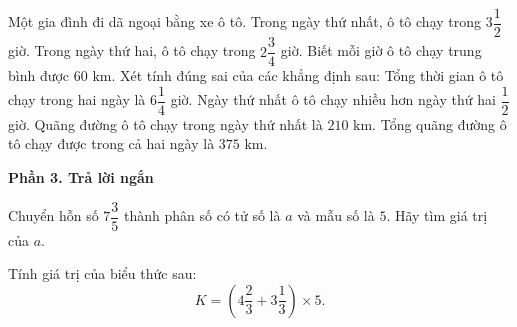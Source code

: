 \begin{ex} %
Một gia đình đi dã ngoại bằng xe ô tô. Trong ngày thứ nhất, ô tô chạy trong $3\dfrac{1}{2}$ giờ. Trong ngày thứ hai, ô tô chạy trong $2\dfrac{3}{4}$ giờ. Biết mỗi giờ ô tô chạy trung bình được $60\text{ km}$. Xét tính đúng sai của các khẳng định sau:
\choiceTF
{\True Tổng thời gian ô tô chạy trong hai ngày là $6\dfrac{1}{4}$ giờ.}
{Ngày thứ nhất ô tô chạy nhiều hơn ngày thứ hai $\dfrac{1}{2}$ giờ.}
{\True Quãng đường ô tô chạy trong ngày thứ nhất là $210\text{ km}$.}
{\True Tổng quãng đường ô tô chạy được trong cả hai ngày là $375\text{ km}$.}
\end{ex}

\textbf{Phần 3. Trả lời ngắn}

\begin{ex} %
Chuyển hỗn số $7\dfrac{3}{5}$ thành phân số có tử số là $a$ và mẫu số là $5$. Hãy tìm giá trị của $a$.
\end{ex}

\begin{ex} %
Tính giá trị của biểu thức sau:
\[
K = \left(4\dfrac{2}{3} + 3\dfrac{1}{3}\right) \times 5.
\]
\end{ex}

